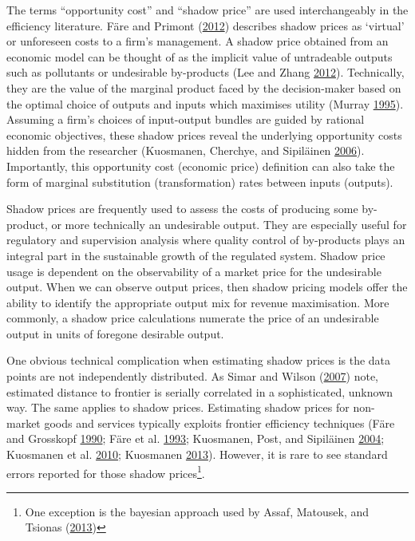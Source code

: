 \documentclass[12pt,]{article}
\begin{document}
The terms ``opportunity cost'' and ``shadow price'' are used interchangeably in the efficiency literature. Färe and Primont (\protect\hyperlink{ref-Fare2012}{2012}) describes shadow prices as `virtual' or unforeseen costs to a firm's management. A shadow price obtained from an economic model can be thought of as the implicit value of untradeable outputs such as pollutants or undesirable by-products (Lee and Zhang \protect\hyperlink{ref-Lee2012}{2012}). Technically, they are the value of the marginal product faced by the decision-maker based on the optimal choice of outputs and inputs which maximises utility (Murray \protect\hyperlink{ref-Murray1995}{1995}). Assuming a firm's choices of input-output bundles are guided by rational economic objectives, these shadow prices reveal the underlying opportunity costs hidden from the researcher (Kuosmanen, Cherchye, and Sipiläinen \protect\hyperlink{ref-Kuosmanen2006}{2006}). Importantly, this opportunity cost (economic price) definition can also take the form of marginal substitution (transformation) rates between inputs (outputs).

Shadow prices are frequently used to assess the costs of producing some by-product, or more technically an undesirable output. They are especially useful for regulatory and supervision analysis where quality control of by-products plays an integral part in the sustainable growth of the regulated system. Shadow price usage is dependent on the observability of a market price for the undesirable output. When we can observe output prices, then shadow pricing models offer the ability to identify the appropriate output mix for revenue maximisation. More commonly, a shadow price calculations numerate the price of an undesirable output in units of foregone desirable output.

One obvious technical complication when estimating shadow prices is the data points are not independently distributed. As Simar and Wilson (\protect\hyperlink{ref-Simar2007}{2007}) note, estimated distance to frontier is serially correlated in a sophisticated, unknown way. The same applies to shadow prices. Estimating shadow prices for non-market goods and services typically exploits frontier efficiency techniques (Färe and Grosskopf \protect\hyperlink{ref-Fare1990}{1990}; Färe et al. \protect\hyperlink{ref-Fare1993}{1993}; Kuosmanen, Post, and Sipiläinen \protect\hyperlink{ref-Kuosmanen2004}{2004}; Kuosmanen et al. \protect\hyperlink{ref-Kuosmanen2010}{2010}; Kuosmanen \protect\hyperlink{ref-Kuosmanen2013}{2013}). However, it is rare to see standard errors reported for those shadow prices\footnote{One exception is the bayesian approach used by Assaf, Matousek, and Tsionas (\protect\hyperlink{ref-Assaf2013}{2013})}.
\end{document}
